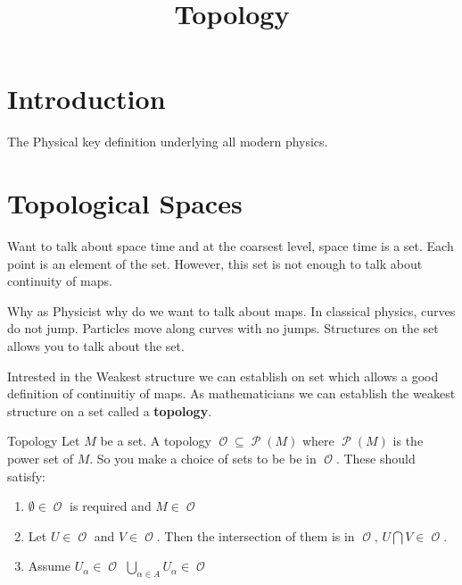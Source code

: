 \documentclass[a4paper, 11pt]{article}
\title{Topology}
\DeclareMathOperator{\Otop}{\mathcal{O}}
\DeclareMathOperator{\Pset}{\mathcal{P}}
\begin{document}
\tableofcontents

\section{Introduction}
The Physical key definition underlying all modern physics.

\begin{center}
\end{center}

\section{Topological Spaces}
Want to talk about space time and at the coarsest level, space time is a set. Each point is an element
of the set. However, this set is not enough to talk about continuity of maps.

Why as Physicist why do we want to talk about maps. In classical physics, curves do not jump. Particles
move along curves with no jumps. Structures on the set allows you to talk about the set.

Intrested in the Weakest structure we can establish on set which allows a good definition of continuitiy
of maps. As mathematicians we can establish the weakest structure on a set called a \textbf{topology}.

\begin{definition}{Topology}
  Let $M$ be a set. A topology $\Otop \subseteq \Pset(M)$ where $\Pset(M)$ is the power set of $M$. So you make a choice
  of sets to be be in $\Otop$. These should satisfy:
  \begin{enumerate}
    \item $\emptyset \in \Otop$ is required and $M \in \Otop$
    \item Let $U\in \Otop$ and $V \in \Otop$. Then the intersection of them is in $\Otop, \, U \bigcap V \in \Otop$.
    \item Assume $U_\alpha \in \Otop$ $\bigcup_{\alpha \in A} U_{\alpha} \in \Otop$
  \end{enumerate}
\end{definition}
\end{document}
